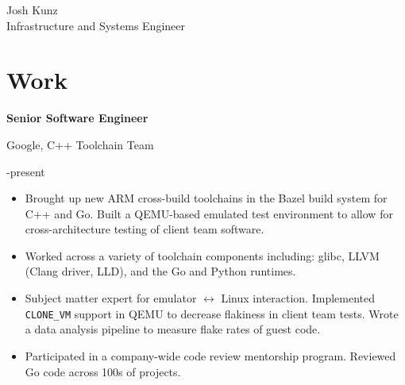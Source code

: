 \documentclass[10pt]{article}
\newcommand{\triline}[3]{%
    \parbox[t][][t]{.4\linewidth}{ #1 }%
    \parbox[t][][t]{.4\linewidth}{ #2 }%
    \parbox[t][][t]{.2\linewidth}{\raggedleft #3 }%
    \vspace{1ex}
}
\newlength{\listpostvertical}
\begin{document}
\titlespacing*{\section}{0pt}{1ex}{2ex}
\titlespacing*{\subsection}{0pt}{1ex}{2ex}

\begin{center}
{ \fontsize{0.6in}{0in}\selectfont Josh Kunz } \\
\vspace{1ex}
{\large Infrastructure and Systems Engineer } \\
\vspace{1ex}
\end{center}

\section{Work}

\triline{\textbf{Senior Software Engineer}}{Google, C++ Toolchain Team}{2019-present}

\begin{itemize}[nosep]
\item Brought up new ARM cross-build toolchains in the Bazel build system for
      C++ and Go. Built a QEMU-based emulated test environment to allow for
      cross-architecture testing of client team software.
\item Worked across a variety of toolchain components including: glibc,
      LLVM (Clang driver, LLD), and the Go and Python runtimes.
\item Subject matter expert for emulator $\leftrightarrow$ Linux interaction.
      Implemented \verb|CLONE_VM| support in QEMU to decrease flakiness in
      client team tests. Wrote a data analysis pipeline to measure flake
      rates of guest code.
\item Participated in a company-wide code review mentorship program. Reviewed 
      Go code across 100s of projects.
\end{itemize}
\vspace{\listpostvertical}
\end{document}
